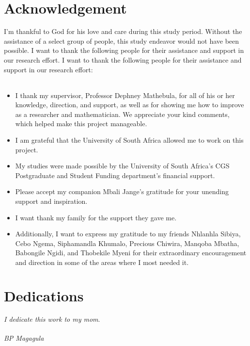 \documentclass{article}
\begin{document}
\section*{Acknowledgement}
I'm thankful to God for his love and care during this study period. Without the assistance of a select group of people, this study endeavor would not have been possible. I want to thank the following people for their assistance and support in our research effort. I want to thank the following people for their assistance and support in our research effort:\\\\
\begin{itemize}
    \item I thank my supervisor, Professor Dephney Mathebula, for all of his or her knowledge, direction, and support, as well as for showing me how to improve as a researcher and mathematician. We appreciate your kind comments, which helped make this project manageable.\\
    \item I am grateful that the University of South Africa allowed me to work on this project.\\
    \item My studies were made possible by the University of South Africa's CGS Postgraduate and Student Funding department's financial support.\\
    \item Please accept my companion Mbali Jange's gratitude for your unending support and inspiration.\\
    \item I want thank my family for the support they gave me.\\
    \item Additionally, I want to express my gratitude to my friends Nhlanhla Sibiya, Cebo Ngema, Siphamandla Khumalo, Precious Chiwira, Manqoba Mbatha, Babongile Ngidi, and Thobekile Myeni for their extraordinary encouragement and direction in some of the areas where I most needed it.
\end{itemize}
\newpage
\section*{Dedications}
\textit{I dedicate this work to my mom}.\\\\
\textit{BP Magagula}
\newpage
{}
\tableofcontents
\clearpage
{}
\end{document}
